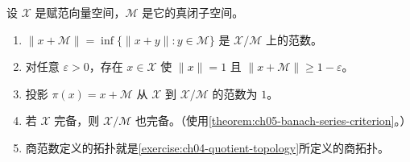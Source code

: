 \documentclass[../../main.tex]{subfiles}
\begin{document}
\begin{exercise}\label{exercise:ch05-quotient-norm}
设 $\mathcal X$ 是赋范向量空间，$\mathcal M$ 是它的真闭子空间。
\begin{enumerate}
\item\label{item:ch05-quotient-is-norm} $\|x+\mathcal M\|=\inf\{\|x+y\|:y\in\mathcal M\}$ 是 $\mathcal X/\mathcal M$ 上的范数。
\item\label{item:ch05-quotient-almost-unit} 对任意 $\varepsilon>0$，存在 $x\in\mathcal X$ 使 $\|x\|=1$ 且 $\|x+\mathcal M\|\ge1-\varepsilon$。
\item\label{item:ch05-quotient-projection-norm} 投影 $\pi(x)=x+\mathcal M$ 从 $\mathcal X$ 到 $\mathcal X/\mathcal M$ 的范数为 $1$。
\item\label{item:ch05-quotient-complete} 若 $\mathcal X$ 完备，则 $\mathcal X/\mathcal M$ 也完备。（使用\cref{theorem:ch05-banach-series-criterion}。）
\item\label{item:ch05-quotient-topology} 商范数定义的拓扑就是\cref{exercise:ch04-quotient-topology}所定义的商拓扑。
\end{enumerate}
\end{exercise}
\end{document}
